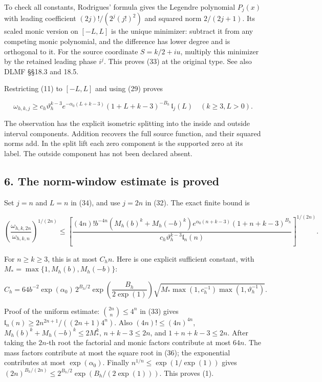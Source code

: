 \documentclass[11pt,a4paper]{article}
\begin{document}
To check all constants, Rodrigues' formula gives the Legendre polynomial \(P_j(x)\) with leading coefficient \((2j)!/(2^j(j!)^2)\) and squared norm \(2/(2j+1)\). Its scaled monic version on \([-L,L]\) is the unique minimizer: subtract it from any competing monic polynomial, and the difference has lower degree and is orthogonal to it. For the source coordinate \(S=k/2+iu\), multiply this minimizer by the retained leading phase \(i^j\). This proves (33) at the original type. See also DLMF §§18.3 and 18.5.

Restricting (11) to \([-L,L]\) and using (29) proves

\[
 \boxed{
 \omega_{h,k,j}\ge
 c_h\vartheta_h^{k-3}
 e^{-\alpha_0(L+k-3)}(1+L+k-3)^{-B_h}\,\mathfrak l_j(L)
 \quad(k\ge3,L>0).}                                                    \tag{34}
\]

The observation has the explicit isometric splitting into the inside and outside interval components. Addition recovers the full source function, and their squared norms add. In the split lift each zero component is the supported zero at its label. The outside component has not been declared absent.

\subsection{6. The norm-window estimate is proved}\label{zlm:endpoint-arithmetic_original--the-norm-window-estimate-is-proved}

Set \(j=n\) and \(L=n\) in (34), and use \(j=2n\) in (32). The exact finite bound is

\[
 \boxed{
 \left(\frac{\omega_{h,k,2n}}{\omega_{h,k,n}}\right)^{1/(2n)}
 \le\left[
 \frac{(4n)!b^{-4n}(M_h(b)^k+M_h(-b)^k)
       e^{\alpha_0(n+k-3)}(1+n+k-3)^{B_h}}
      {c_h\vartheta_h^{k-3}\mathfrak l_n(n)}
       \right]^{1/(2n)}.}                                              \tag{35}
\]

For \(n\ge k\ge3\), this is at most \(C_hn\). Here is one explicit sufficient constant, with \(M_* =\max\{1,M_h(b),M_h(-b)\}\):

\[
 \boxed{
 C_h=64b^{-2}\exp(\alpha_0)\,2^{B_h/2}
       \exp\!\left(\frac{B_h}{2\exp(1)}\right)
       \sqrt{M_*\max(1,c_h^{-1})\max(1,\vartheta_h^{-1})}.
 }                                                                     \tag{36}
\]

Proof of the uniform estimate: \(\binom{2n}{n}\le4^n\) in (33) gives \(\mathfrak l_n(n)\ge2n^{2n+1}/((2n+1)4^n)\). Also \((4n)!\le(4n)^{4n}\), \(M_h(b)^k+M_h(-b)^k\le2M_*^k\), \(n+k-3\le2n\), and \(1+n+k-3\le2n\). After taking the \(2n\)-th root the factorial and monic factors contribute at most \(64n\). The mass factors contribute at most the square root in (36); the exponential contributes at most \(\exp(\alpha_0)\). Finally \(n^{1/n}\le\exp(1/\exp(1))\) gives \((2n)^{B_h/(2n)}\le2^{B_h/2}\exp(B_h/(2\exp(1)))\). This proves (1).
\end{document}
